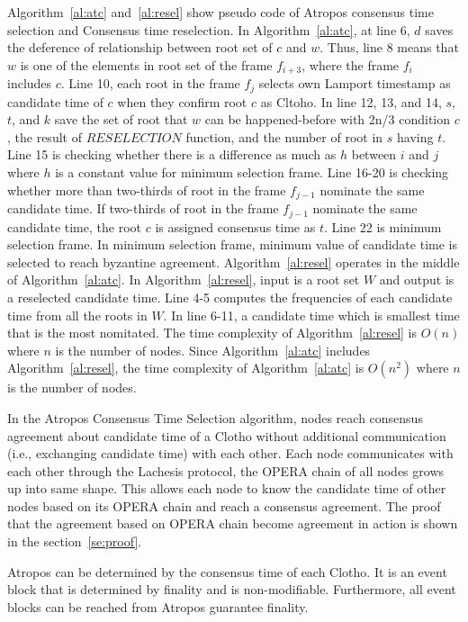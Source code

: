 \documentclass{article}
\begin{document}
Algorithm~\ref{al:atc} and~\ref{al:resel} show pseudo code of Atropos consensus time selection and Consensus time reselection. In Algorithm~\ref{al:atc}, at line 6, $d$ saves the deference of relationship between root set of $c$ and $w$. Thus, line 8 means that $w$ is one of the elements in root set of the frame $f_{i+3}$, where the frame $f_i$ includes $c$. Line 10, each root in the frame $f_j$ selects own Lamport timestamp as candidate time of $c$ when they confirm root $c$ as Cltoho. In line 12, 13, and 14, $s$, $t$, and $k$ save the set of root that $w$ can be happened-before with 2n/3 condition $c$, the result of $RESELECTION$ function, and the number of root in $s$ having $t$. Line 15 is checking whether there is a difference as much as $h$ between $i$ and $j$ where $h$ is a constant value for minimum selection frame. Line 16-20 is checking whether more than two-thirds of root in the frame $f_{j-1}$ nominate the same candidate time. If two-thirds of root in the frame $f_{j-1}$ nominate the same candidate time, the root $c$ is assigned consensus time as $t$. Line 22 is minimum selection frame. In minimum selection frame, minimum value of candidate time is selected to reach byzantine agreement. Algorithm~\ref{al:resel} operates in the middle of Algorithm~\ref{al:atc}. In Algorithm~\ref{al:resel}, input is a root set $W$ and output is a reselected candidate time. Line 4-5 computes the frequencies of each candidate time from all the roots in $W$. In line 6-11, a candidate time which is smallest time that is the most nomitated. The time complexity of Algorithm~\ref{al:resel} is $O(n)$ where $n$ is the number of nodes. Since Algorithm~\ref{al:atc} includes Algorithm~\ref{al:resel}, the time complexity of Algorithm~\ref{al:atc} is $O(n^2)$ where $n$ is the number of nodes.

In the Atropos Consensus Time Selection algorithm, nodes reach consensus agreement about candidate time of a Clotho without additional communication (i.e., exchanging candidate time) with each other. Each node communicates with each other through the Lachesis protocol, the OPERA chain of all nodes grows up into same shape. This allows each node to know the candidate time of other nodes based on its OPERA chain and reach a consensus agreement. The proof that the agreement based on OPERA chain become agreement in action is shown in the section~\ref{se:proof}.

Atropos can be determined by the consensus time of each Clotho. It is an event block that is determined by finality and is non-modifiable. Furthermore, all event blocks can be reached from Atropos guarantee finality.
\end{document}
